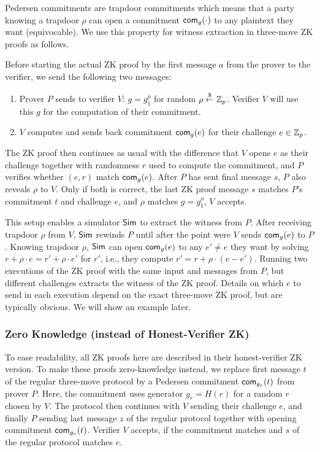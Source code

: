Pedersen commitments are trapdoor commitments which means that a party
knowing a trapdoor $\rho$ can open a commitment $\mathsf{com}_g(\cdot)$ to any
plaintext they want (equivocable).  We use this property for witness
extraction in three-move ZK proofs as follows.

Before starting the actual ZK proof by the first message $a$ from the
prover to the verifier, we send the following two messages:
\begin{enumerate}
\item Prover $P$ sends to verifier $V$: $g=g_1^\rho$ for random
  $\rho\stackrel{\$}{\leftarrow}\mathbb{Z}_p$. Verifier $V$ will use this $g$ for the computation
  of their commitment.
  \item $V$ computes and sends back commitment $\mathsf{com}_g(e)$ for their
    challenge $e\in\mathbb{Z}_p$.
\end{enumerate}

The ZK proof then continues as usual with the difference that $V$
opens $e$ as their challenge together with randomness $r$ used to
compute the commitment, and $P$ verifies whether $(e,r)$ match
$\mathsf{com}_g(e)$.  After $P$ has sent final message $s$, $P$ also
reveals $\rho$ to $V$. Only if both is correct, the last ZK proof
message $s$ matches $P$'s commitment $t$ and challenge $e$, and $\rho$
matches $g=g_1^\rho$, $V$ accepts.

This setup enables a simulator ${\mathsf{Sim}}$ to extract the witness from
$P$. After receiving trapdoor $\rho$ from $V$, ${\mathsf{Sim}}$ rewinds $P$ until
after the point were $V$ sends $\mathsf{com}_g(e)$ to $P$. Knowing trapdoor
$\rho$, ${\mathsf{Sim}}$ can open $\mathsf{com}_g(e)$ to any $e'\neq{}e$ they want by
solving $r+\rho\cdot{}e=r'+\rho\cdot{}e'$ for $r'$, i.e., they compute
$r'=r+\rho\cdot{}(e-e')$. Running two executions of the ZK proof with the
same input and messages from $P$, but different challenges extracts
the witness of the ZK proof. Details on which $e$ to send in each
execution depend on the exact three-move ZK proof, but are typically
obvious. We will show an example later.

\subsubsection{Zero Knowledge (instead of Honest-Verifier ZK)}
To ease readability, all ZK proofs here are described in their
honest-verifier ZK version. To make these proofs zero-knowledge
instead, we replace first message $t$ of the regular three-move
protocol by a Pedersen commitment $\mathsf{com}_{g_r}(t)$ from prover
$P$. Here, the commitment uses generator $g_r=H(r)$ for a random $r$
chosen by $V$. The protocol then continues with $V$ sending their
challenge $e$, and finally $P$ sending last message $z$ of the regular
protocol together with opening commitment $\mathsf{com}_{g_r}(t)$. Verifier
$V$ accepts, if the commitment matches and $s$ of the regular protocol
matches $e$.

